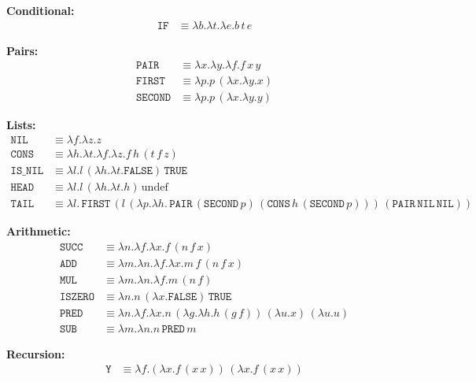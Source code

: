 \documentclass[12pt]{book}
\theoremstyle{plain}
\theoremstyle{definition}
\theoremstyle{definition}
\theoremstyle{definition}
\begin{document}
\textbf{Conditional:}
\begin{align*}
\texttt{IF} &\equiv \lambda b.\lambda t.\lambda e. b\,t\,e
\end{align*}

\textbf{Pairs:}
\begin{align*}
\texttt{PAIR} &\equiv \lambda x.\lambda y.\lambda f. f\,x\,y \\
\texttt{FIRST} &\equiv \lambda p. p\,(\lambda x.\lambda y. x) \\
\texttt{SECOND} &\equiv \lambda p. p\,(\lambda x.\lambda y. y)
\end{align*}

\textbf{Lists:}
\begin{align*}
\texttt{NIL} &\equiv \lambda f.\lambda z. z \\
\texttt{CONS} &\equiv \lambda h.\lambda t.\lambda f.\lambda z. f\,h\,(t\,f\,z) \\
\texttt{IS\_NIL} &\equiv \lambda l. l\,(\lambda h.\lambda t. \texttt{FALSE})\,\texttt{TRUE} \\
\texttt{HEAD} &\equiv \lambda l. l\,(\lambda h.\lambda t. h)\,\text{undef} \\
\texttt{TAIL} &\equiv \lambda l.\, \texttt{FIRST}\,(l\,(\lambda p.\lambda h.\, \texttt{PAIR}\,(\texttt{SECOND}\,p)\,(\texttt{CONS}\,h\,(\texttt{SECOND}\,p)))\,(\texttt{PAIR}\,\texttt{NIL}\,\texttt{NIL}))
\end{align*}

\textbf{Arithmetic:}
\begin{align*}
\texttt{SUCC} &\equiv \lambda n.\lambda f.\lambda x. f\,(n\,f\,x) \\
\texttt{ADD} &\equiv \lambda m.\lambda n.\lambda f.\lambda x. m\,f\,(n\,f\,x) \\
\texttt{MUL} &\equiv \lambda m.\lambda n.\lambda f. m\,(n\,f) \\
\texttt{ISZERO} &\equiv \lambda n. n\,(\lambda x.\texttt{FALSE})\,\texttt{TRUE} \\
\texttt{PRED} &\equiv \lambda n.\lambda f.\lambda x. n\,(\lambda g.\lambda h. h\,(g\,f))\,(\lambda u. x)\,(\lambda u. u) \\
\texttt{SUB} &\equiv \lambda m.\lambda n. n\,\texttt{PRED}\,m
\end{align*}

\textbf{Recursion:}
\begin{align*}
\texttt{Y} &\equiv \lambda f.(\lambda x. f\,(x\,x))\,(\lambda x. f\,(x\,x))
\end{align*}
\end{document}
